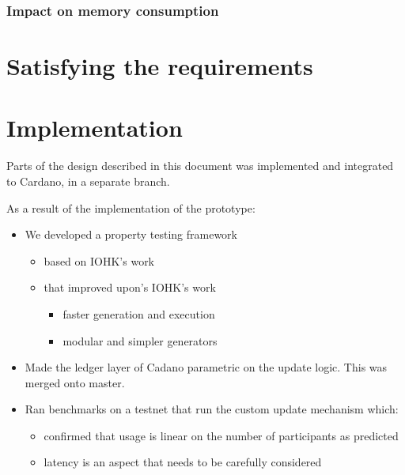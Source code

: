 \documentclass[11pt,a4paper]{article}
\begin{document}
\subsubsection{Impact on memory consumption}
\label{sec:impact-memory-cons}

\section{Satisfying the requirements}
\label{sec:satisfy-requ}



\section{Implementation}
\label{sec:implementation-1}

Parts of the design described in this document was implemented and integrated to Cardano,
in a separate branch.


As a result of the implementation of the prototype:
\begin{itemize}
\item We developed a property testing framework
  \begin{itemize}
  \item based on IOHK's work
  \item that improved upon's IOHK's work
    \begin{itemize}
    \item faster generation and execution
    \item modular and simpler generators
    \end{itemize}
  \end{itemize}
\item Made the ledger layer of Cadano parametric on the update logic. This was
  merged onto master.
\item Ran benchmarks on a testnet that run the custom update mechanism which:
  \begin{itemize}
  \item confirmed that usage is linear on the number of participants as predicted
  \item latency is an aspect that needs to be carefully considered
  \end{itemize}
\end{itemize}
\end{document}
